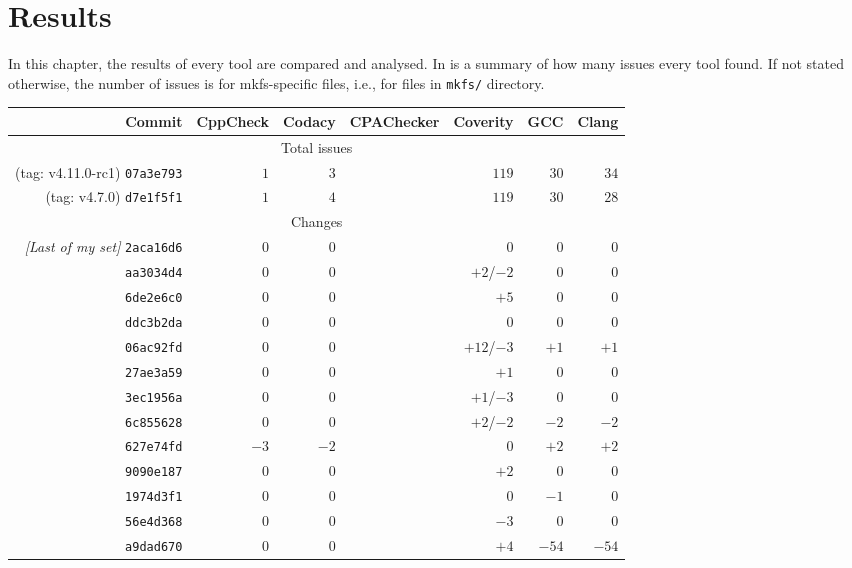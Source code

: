 
\chapter{Results}\label{chap:results}

In this chapter, the results of every tool are compared and analysed. In
 is a summary of how many issues every tool
found. If not stated otherwise, the number of issues is for mkfs-specific
files, i.e., for files in {\tt mkfs/} directory.

\begin{table}[h]
\begin{tabular}{|r||r|r|r|r|r|r|}
\hline
Commit & CppCheck & Codacy & CPAChecker & Coverity & GCC & Clang \\
\hline
\hline
\multicolumn{7}{|c|}{Total issues}\\
\hline
(tag: v4.11.0-rc1) {\tt 07a3e793} & $1$ & $3$ & & $119$ & $30$ & $34$ \\
\hline
(tag: v4.7.0) {\tt d7e1f5f1} & $1$ & $4$ & & $119$ & $30$ & $28$ \\
\hline
\hline
\multicolumn{7}{|c|}{Changes}\\
\hline
{\em [Last of my set]} {\tt 2aca16d6} & 0 & 0 & & 0 & 0 & 0 \\
\hline
{\tt aa3034d4} & 0 & 0 & & $+2$/$-2$ & 0 & 0 \\
\hline
{\tt 6de2e6c0} & 0 & 0 & & $+5$ & 0 & 0 \\
\hline
{\tt ddc3b2da} & 0 & 0 & & 0 & 0 & 0\\
\hline
{\tt 06ac92fd} & 0 & 0 & & $+12$/$-3$ & $+1$ & $+1$\\
\hline
{\tt 27ae3a59} & 0 & 0 & & $+1$ & 0 & 0 \\
\hline
{\tt 3ec1956a} & 0 & 0 & & $+1$/$-3$ & 0 & 0 \\
\hline
{\tt 6c855628} & 0 & 0 & & $+2$/$-2$ & $-2$ & $-2$ \\
\hline
{\tt 627e74fd} & $-3$ & $-2$ & & 0 & $+2$ & $+2$ \\
\hline
{\tt 9090e187} & 0 & 0 & & $+2$ & 0 & 0 \\
\hline
{\tt 1974d3f1} & 0 & 0 & & 0 & $-1$ & 0 \\
\hline
{\tt 56e4d368} & 0 & 0 & & $-3$ & 0 & 0 \\
\hline
{\tt a9dad670} & 0 & 0 & & $+4$ & $-54$ & $-54$ \\

\end{tabular}
\end{table}
